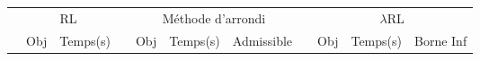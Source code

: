 \vspace*{1.2cm}

\begin{landscape}

\begin{table*}[h!]\centering
{}
\begin{tabular}{@{}rrrcrrrcrrr@{}}\toprule
& \multicolumn{2}{c}{RL} & \phantom{abc} & \multicolumn{3}{c}{Méthode d'arrondi} & \phantom{abc} & \multicolumn{3}{c}{$\lambda$RL}\\
\cmidrule{2-3} \cmidrule{5-7} \cmidrule{9-11}
& Obj & Temps(s) & & Obj & Temps(s) & Admissible & & Obj & Temps(s) & Borne Inf\\ \midrule


\end{tabular}
\end{table*}
\end{landscape}
